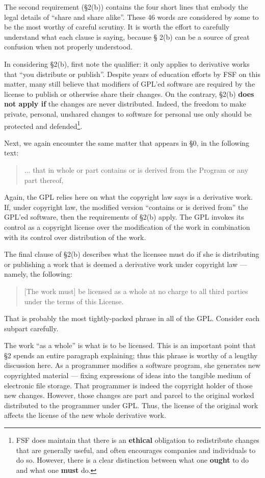 \documentclass[12pt]{report}
\begin{document}
\medskip

The second requirement (\S 2(b)) contains the four short lines that embody
the legal details of ``share and share alike''.  These 46 words are
considered by some to be the most worthy of careful scrutiny.  It is worth
the effort to carefully understand what each clause is saying, because \S
2(b) can be a source of great confusion when not properly understood.

In considering \S 2(b), first note the qualifier: it only applies to
derivative works that ``you distribute or publish''.  Despite years of
education efforts by FSF on this matter, many still believe that modifiers
of GPL'ed software are required by the license to publish or otherwise
share their changes.  On the contrary, \S 2(b) {\bf does not apply if} the
changes are never distributed.  Indeed, the freedom to make private,
personal, unshared changes to software for personal use only should be
protected and defended\footnote{FSF does maintain that there is an {\bf
    ethical} obligation to redistribute changes that are generally useful,
  and often encourages companies and individuals to do so.  However, there
  is a clear distinction between what one {\bf ought} to do and what one
  {\bf must} do.}.

Next, we again encounter the same matter that appears in \S 0, in the
following text:
\begin{quote}
... that in whole or part contains or is derived from the Program or any
  part thereof,
\end{quote}
Again, the GPL relies here on what the copyright law says is a derivative
work.  If, under copyright law, the modified version ``contains or is
derived from'' the GPL'ed software, then the requirements of \S 2(b)
apply.  The GPL invokes its control as a copyright license over the
modification of the work in combination with its control over distribution
of the work.

The final clause of \S 2(b) describes what the licensee must do if she is
distributing or publishing a work that is deemed a derivative work under
copyright law --- namely, the following:
\begin{quote}
[The work must] be licensed as a whole at no charge to all third parties
under the terms of this License.
\end{quote}
That is probably the most tightly-packed phrase in all of the GPL\@.
Consider each subpart carefully.

The work ``as a whole'' is what is to be licensed.  This is an important
point that \S 2 spends an entire paragraph explaining; thus this phrase is
worthy of a lengthy discussion here.  As a programmer modifies a software
program, she generates new copyrighted material --- fixing expressions of
ideas into the tangible medium of electronic file storage.  That
programmer is indeed the copyright holder of those new changes.  However,
those changes are part and parcel to the original worked distributed to
the programmer under GPL\@.  Thus, the license of the original work
affects the license of the new whole derivative work.
\end{document}
